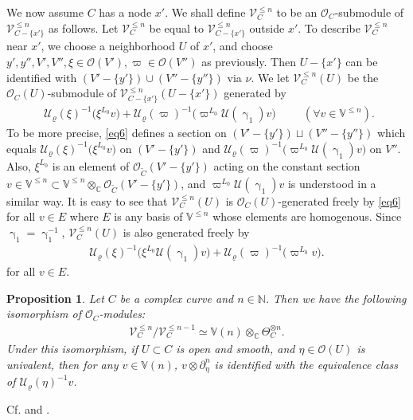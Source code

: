 \documentclass[12pt,a4paper,notitlepage]{article}
\theoremstyle{definition}
\theoremstyle{plain}
\newtheorem{pp}[df]{Proposition}
\newcommand{\mc}{\mathcal}
\newcommand{\wtd}{\widetilde}
\newcommand{\scr}{\mathscr}
\newcommand{\Vbb}{\mathbb V}
\newcommand{\Cbb}{\mathbb C}
\newcommand{\Nbb}{\mathbb N}
\numberwithin{equation}{section}
\begin{document}
We now assume $C$ has a node $x'$. We shall define $\scr V_C^{\leq n}$ to be an $\scr O_C$-submodule of $\scr V^{\leq n}_{C-\{x'\}}$ as follows. Let $\scr V_C^{\leq n}$ be equal to $\scr V^{\leq n}_{C-\{x'\}}$ outside $x'$. To describe $\scr V_C^{\leq n}$ near $x'$, we choose a neighborhood $U$ of $x'$, and choose $y',y'',V',V'',\xi\in\scr O(V'),\varpi\in\scr O(V'')$ as previously. Then $U-\{x'\}$ can be identified with $(V'-\{y'\})\cup (V''-\{y''\})$ via $\nu$. We let $\scr V_C^{\leq n}(U)$ be the $\scr O_C(U)$-submodule of $\scr V_{C-\{x'\}}^{\leq n}(U-\{x'\})$ generated by
\begin{align}
\boxed{~~\mc U_\varrho(\xi)^{-1}\big(\xi^{L_0}v\big)+\mc U_\varrho(\varpi)^{-1}\big(\varpi^{L_0}\mc U(\upgamma_1)v\big)~~}\qquad (\forall v\in\Vbb^{\leq n}).\label{eq6}
\end{align}
To be more precise, \eqref{eq6} defines a section on $(V'-\{y'\})\sqcup (V''-\{y''\})$ which equals $\mc U_\varrho(\xi)^{-1}\big(\xi^{L_0}v\big)$ on $(V'-\{y'\})$ and $\mc U_\varrho(\varpi)^{-1}\big(\varpi^{L_0}\mc U(\upgamma_1)v\big)$ on $V''$. Also, $\xi^{L_0}$ is an element of $\scr O_{\wtd C}(V'-\{y'\})$ acting on the constant section $v\in\Vbb^{\leq n}\subset\Vbb^{\leq n}\otimes_{\Cbb}\scr O_{\wtd C}(V'-\{y'\})$, and $\varpi^{L_0}\mc U(\upgamma_1)v$ is understood in a similar way.  It is easy to see that $\scr V_C^{\leq n}(U)$ is $\scr O_C(U)$-generated freely by \eqref{eq6} for all $v\in E$ where $E$ is any basis of $\Vbb^{\leq n}$ whose elements are homogenous. Since $\upgamma_1=\upgamma_1^{-1}$, $\scr V_C^{\leq n}(U)$ is also generated freely by
\begin{align}
\mc U_\varrho(\xi)^{-1}\big(\xi^{L_0}\mc U(\upgamma_1)v\big)+\mc U_\varrho(\varpi)^{-1}\big(\varpi^{L_0}v\big).
\end{align}
for all $v\in E$.

\begin{pp}\label{lb3}
Let $C$ be a complex curve and $n\in\Nbb$. Then we have the following isomorphism of  $\scr O_C$-modules:
\begin{align}
\scr V_C^{\leq n}/\scr V_C^{\leq n-1}\simeq\Vbb(n)\otimes_{\Cbb}\Theta_C^{\otimes n}.\label{eq7}
\end{align}
Under this isomorphism, if $U\subset C$ is open and smooth, and $\eta\in\scr O(U)$ is univalent, then for any $v\in\Vbb(n)$, $v\otimes \partial_\eta^n$ is identified with the equivalence class of $\mc U_\varrho(\eta)^{-1}v$.
\end{pp}

Cf. \cite[Sec.6.5.9]{FB04} and \cite{DGT19b}.
\end{document}
